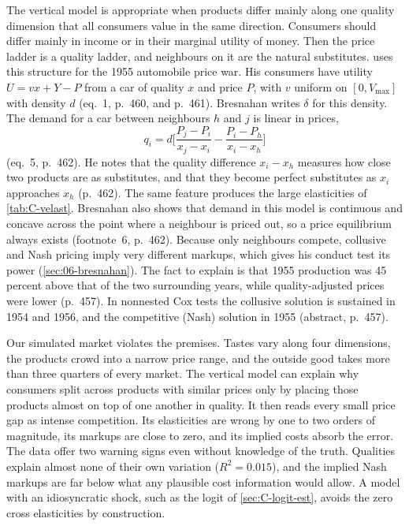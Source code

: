 The vertical model is appropriate when products differ mainly along one quality dimension that all consumers value in
the same direction. Consumers should differ mainly in income or in their marginal utility of money. Then the price
ladder is a quality ladder, and neighbours on it are the natural substitutes. \citet{Bresnahan1987} uses this structure
for the 1955 automobile price war. His consumers have utility $U = vx + Y - P$ from a car of quality $x$ and price $P$,
with $v$ uniform on $[0, V_{\max}]$ with density $d$ (eq.~1, p.~460, and p.~461). Bresnahan writes $\delta$ for
this density. The demand for a car between
neighbours $h$ and $j$ is linear in prices,
\[
  q_i = d\Big[\frac{P_j - P_i}{x_j - x_i} - \frac{P_i - P_h}{x_i - x_h}\Big]
\]
(eq.~5, p.~462). He notes that the quality difference $x_i - x_h$ measures how close two products are as substitutes,
and that they become perfect substitutes as $x_i$ approaches $x_h$ (p.~462). The same feature produces the large
elasticities of \cref{tab:C-velast}. Bresnahan also shows that demand in this model is continuous and concave across the
point where a neighbour is priced out, so a price equilibrium always exists (footnote~6, p.~462). Because only neighbours
compete, collusive and Nash pricing imply very different markups, which gives his conduct test its power
(\cref{sec:06-bresnahan}). The fact to explain is that 1955 production was 45 percent above that of the two surrounding
years, while quality-adjusted prices were lower (p.~457). In nonnested Cox tests the collusive solution is sustained in
1954 and 1956, and the competitive (Nash) solution in 1955 (abstract, p.~457).

Our simulated market violates the premises. Tastes vary along four dimensions, the products crowd into a narrow price
range, and the outside good takes more than three quarters of every market. The vertical model can explain why consumers
split across products with similar prices only by placing those products almost on top of one another in quality. It
then reads every small price gap as intense competition. Its elasticities are wrong by one to two orders of magnitude,
its markups are close to zero, and its implied costs absorb the error. The data offer two warning signs even without
knowledge of the truth. Qualities explain almost none of their own variation ($R^2 = 0.015$), and the implied Nash
markups are far below what any plausible cost information would allow. A model with an idiosyncratic shock, such as
the logit of \cref{sec:C-logit-est}, avoids the zero cross elasticities by construction.

